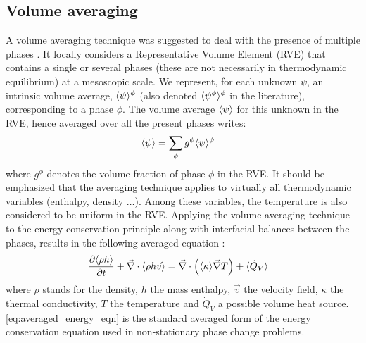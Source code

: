 \subsection{Volume averaging} 
A volume averaging technique was suggested to deal with the presence of multiple phases \cite{ni_volume-averaged_1991}. It locally considers a 
Representative Volume Element (RVE) that contains a single or several phases (these are not necessarily in thermodynamic equilibrium) 
at a mesoscopic scale. We represent, for each unknown $\psi$, an intrinsic volume average, $\langle \psi \rangle^{\phi}$ (also denoted $\langle \psi^{\phi} \rangle^{\phi}$ in the 
literature), corresponding to a phase $\phi$. The volume average $\langle \psi \rangle$ for this unknown in the RVE, hence averaged over all the present phases writes:
\begin{align}
\label{eq:volume_average_psi}
& \langle \psi \rangle = \sum_\phi g^{\phi}  \langle \psi \rangle^{\phi}
\end{align}
where $g^\phi$ denotes the volume fraction of phase $\phi$ in the RVE. 
It should be emphasized that the averaging technique applies to virtually all thermodynamic variables (enthalpy, density $\dots$). 
Among these variables, the temperature is also considered to be uniform in the RVE. Applying the volume averaging technique to the energy 
conservation principle along with interfacial balances between the phases, results in the following averaged equation \cite{rappaz_numerical_2003}:
\begin{align}
\label{eq:averaged_energy_eqn}
& \frac{\partial \langle  \rho h  \rangle}{\partial t} + \vec{\nabla} \cdot \langle  \rho h \vec{v}  \rangle = \vec{\nabla} \cdot \left( \langle \kappa \rangle \vec{\nabla} T \right) + \langle \dot{Q}_V \rangle
\end{align}
where $\rho$ stands for the density, $h$ the mass enthalpy, $\vec{v}$ the velocity field, $\kappa$ the thermal conductivity, $T$ the temperature 
and $\dot{Q}_V$ a possible volume heat source. \autoref{eq:averaged_energy_eqn} is the standard averaged form of the energy conservation equation used in non-stationary phase 
change problems. 
 
